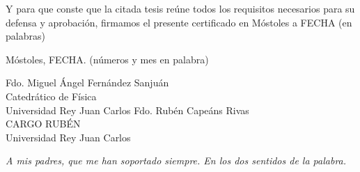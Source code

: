 \documentclass[a4paper,12pt]{newsiambook}
\newcommand{\clearemptydoublepage}{\newpage{\pagestyle{empty}\cleardoublepage}}
\newcommand{\dedica}{\sffamily \slshape}
\begin{document}
Y para que conste que la citada tesis reúne todos los requisitos necesarios para su defensa y aprobación, firmamos el presente certificado en Móstoles a FECHA (en palabras)

\vspace*{1cm}

\raggedleft
Móstoles, FECHA. (números y mes en palabra)

\centering


\vspace*{3.5cm}


\begin{multicols}{2}
Fdo. Miguel Ángel Fernández Sanjuán \\ Catedrático de Física \\ Universidad Rey Juan Carlos 
\columnbreak
Fdo. Rubén Capeáns Rivas \\ CARGO RUBÉN \\ Universidad Rey Juan Carlos
\end{multicols}


\justifying

\clearemptydoublepage

\thispagestyle{empty}

\begin{flushright}

\begin{minipage}[t][5cm][b]{0,5\textwidth}

{\dedica \large A mis padres, que me han soportado siempre. En los dos sentidos de la palabra.}

\end{minipage}
\end{flushright}

\clearemptydoublepage



 


\clearemptydoublepage



\setcounter{chapter}{0}





\clearemptydoublepage

\tableofcontents \clearemptydoublepage

\end{document}
